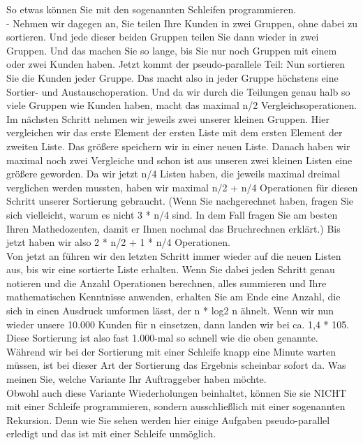 So etwas können Sie mit den sogenannten Schleifen programmieren.\\


-	Nehmen wir dagegen an, Sie teilen Ihre Kunden in zwei Gruppen, ohne dabei zu sortieren. Und jede dieser beiden Gruppen teilen Sie dann wieder in zwei Gruppen. Und das machen Sie so lange, bis Sie nur noch Gruppen mit einem oder zwei Kunden haben. Jetzt kommt der pseudo-parallele Teil: Nun sortieren Sie die Kunden jeder Gruppe. Das macht also in jeder Gruppe höchstens eine Sortier- und Austauschoperation. Und da wir durch die Teilungen genau halb so viele Gruppen wie Kunden haben, macht das maximal n/2 Vergleichsoperationen. \\


Im nächsten Schritt nehmen wir jeweils zwei unserer kleinen Gruppen. Hier vergleichen wir das erste Element der ersten Liste mit dem ersten Element der zweiten Liste. Das größere speichern wir in einer neuen Liste. Danach haben wir maximal noch zwei Vergleiche und schon ist aus unseren zwei kleinen Listen eine größere geworden. Da wir jetzt n/4 Listen haben, die jeweils maximal dreimal verglichen werden mussten, haben wir maximal n/2 + n/4 Operationen für diesen Schritt unserer Sortierung gebraucht. (Wenn Sie nachgerechnet haben, fragen Sie sich vielleicht, warum es nicht 3 * n/4 sind. In dem Fall fragen Sie am besten Ihren Mathedozenten, damit er Ihnen nochmal das Bruchrechnen erklärt.) Bis jetzt haben wir also 2 * n/2 + 1 * n/4 Operationen.\\


Von jetzt an führen wir den letzten Schritt immer wieder auf die neuen Listen aus, bis wir eine sortierte Liste erhalten. Wenn Sie dabei jeden Schritt genau notieren und die Anzahl Operationen berechnen, alles summieren und Ihre mathematischen Kenntnisse anwenden, erhalten Sie am Ende eine Anzahl, die sich in einen Ausdruck umformen lässt, der n * log2 n ähnelt. Wenn wir nun wieder unsere 10.000 Kunden für n einsetzen, dann landen wir bei ca. 1,4 * 105. Diese Sortierung ist also fast 1.000-mal so schnell wie die oben genannte. Während wir bei der Sortierung mit einer Schleife knapp eine Minute warten müssen, ist bei dieser Art der Sortierung das Ergebnis scheinbar sofort da. Was meinen Sie, welche Variante Ihr Auftraggeber haben möchte.\\


Obwohl auch diese Variante Wiederholungen beinhaltet, können Sie sie NICHT mit einer Schleife programmieren, sondern ausschließlich mit einer sogenannten Rekursion. Denn wie Sie sehen werden hier einige Aufgaben pseudo-parallel erledigt und das ist mit einer Schleife unmöglich.\\

